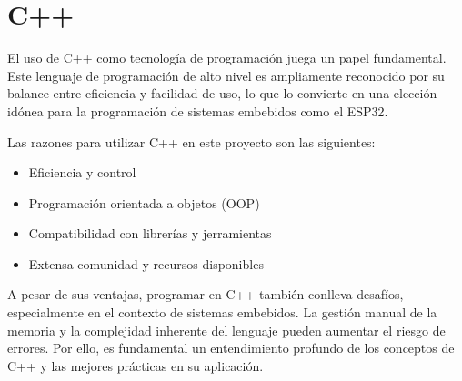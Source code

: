 \section{C++}


El uso de C++ como tecnología de programación juega un papel fundamental. Este lenguaje de programación de alto nivel es ampliamente reconocido por su balance entre eficiencia y facilidad de uso, lo que lo convierte en una elección idónea para la programación de sistemas embebidos como el ESP32.

Las razones para utilizar C++ en este proyecto son las siguientes:

\begin{itemize}
   \item Eficiencia y control
   \item Programación orientada a objetos (OOP)
   \item Compatibilidad con librerías y jerramientas
   \item Extensa comunidad y recursos disponibles
\end{itemize}

A pesar de sus ventajas, programar en C++ también conlleva desafíos, especialmente en el contexto de sistemas embebidos. La gestión manual de la memoria y la complejidad inherente del lenguaje pueden aumentar el riesgo de errores. Por ello, es fundamental un entendimiento profundo de los conceptos de C++ y las mejores prácticas en su aplicación.
